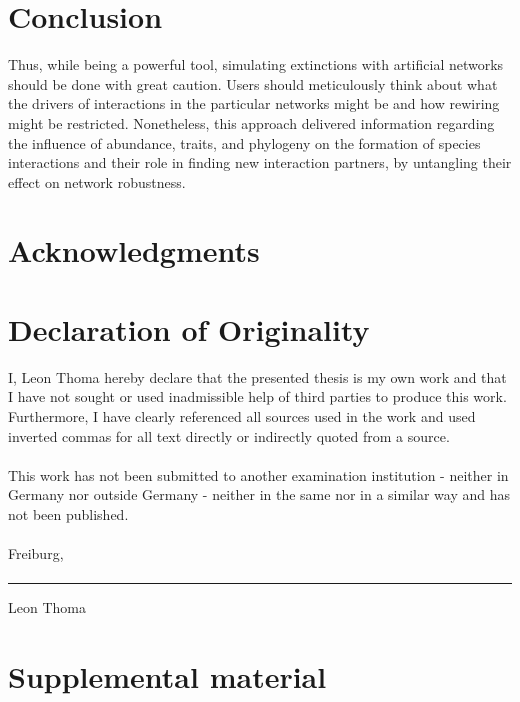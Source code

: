 \documentclass[12pt,a4paper]{article}
\begin{document}
\section{Conclusion}
Thus, while being a powerful tool, simulating extinctions with artificial networks should be done with great caution. Users should meticulously think about what the drivers of interactions in the particular networks might be and how rewiring might be restricted. Nonetheless, this approach delivered information regarding the influence of abundance, traits, and phylogeny on the formation of species interactions and their role in finding new interaction partners, by untangling their effect on network robustness.
\section{Acknowledgments}
\newpage
\section*{Declaration of Originality}
I, Leon Thoma hereby declare that the presented thesis is my own work and that I have not sought or used inadmissible help of third parties to produce this work. Furthermore, I have clearly referenced all sources used in the work and used inverted commas for all text directly or indirectly quoted from a source.\paragraph{}
This work has not been submitted to another examination institution - neither in Germany nor outside Germany - neither in the same nor in a similar way and has not been published.\paragraph{}

Freiburg,\paragraph{}

\rule{5cm}{.4pt}\par
Leon Thoma
\newpage
\section{Supplemental material}
\end{document}
